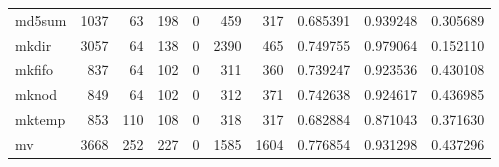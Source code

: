 \begin{longtable}{lrrrrrrrrr}
md5sum    &                                               1037 &                                                 63 &                                                198 &                                                  0 &                                                459 &                                                317 &                                           0.685391 &                               0.939248 &                             0.305689 \\
mkdir     &                                               3057 &                                                 64 &                                                138 &                                                  0 &                                               2390 &                                                465 &                                           0.749755 &                               0.979064 &                             0.152110 \\
mkfifo    &                                                837 &                                                 64 &                                                102 &                                                  0 &                                                311 &                                                360 &                                           0.739247 &                               0.923536 &                             0.430108 \\
mknod     &                                                849 &                                                 64 &                                                102 &                                                  0 &                                                312 &                                                371 &                                           0.742638 &                               0.924617 &                             0.436985 \\
mktemp    &                                                853 &                                                110 &                                                108 &                                                  0 &                                                318 &                                                317 &                                           0.682884 &                               0.871043 &                             0.371630 \\
mv        &                                               3668 &                                                252 &                                                227 &                                                  0 &                                               1585 &                                               1604 &                                           0.776854 &                               0.931298 &                             0.437296 \\

\end{longtable}

